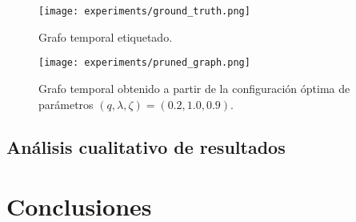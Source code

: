 \documentclass[letterpaper,12pt,oneside]{book} %
\begin{document}

\begin{figure}
    \centering
    \texttt{[image: experiments/ground\_truth.png]}
    \caption{Grafo temporal etiquetado.}
    \label{img:ground_truth}
\end{figure}

\begin{figure}
    \centering
    \texttt{[image: experiments/pruned\_graph.png]}
    \caption{Grafo temporal obtenido a partir de la configuración óptima de parámetros $(q, \lambda, \zeta) = (0.2, 1.0, 0.9)$.}
    \label{img:pruned_graph}
\end{figure}
\section{Análisis cualitativo de resultados}


\chapter{Conclusiones}




\end{document}
